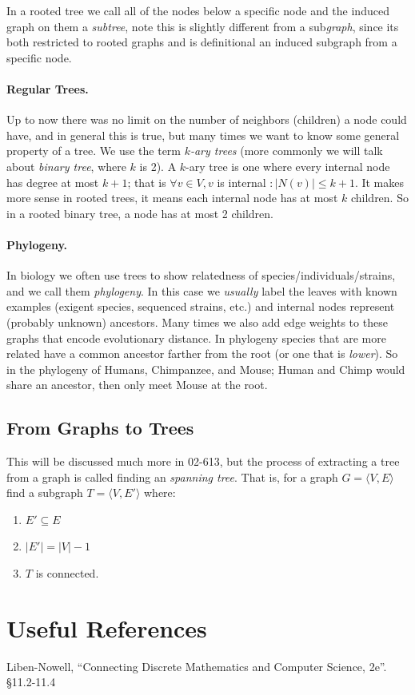 In a rooted tree we call all of the nodes below a specific node and the induced graph on them a \emph{subtree}, 
note this is slightly different from a sub\textit{graph}, since its both restricted to rooted graphs and is definitional an induced subgraph from a specific node. 


\paragraph{Regular Trees.} 
Up to now there was no limit on the number of neighbors (children) a node could have, and in general this is true, but many times we want to know some general property of a tree. 
We use the term \emph{$k$-ary trees} (more commonly we will talk about \emph{binary tree}, where $k$ is 2).
A $k$-ary tree is one where every internal node has degree at most $k+1$; that is 
$\forall v\in V, v $ is internal $: |N(v)| \le k+1$. 
It makes more sense in rooted trees, it means each internal node has at most $k$ children. 
So in a rooted binary tree, a node has at most 2 children. 

\paragraph{Phylogeny.} 
In biology we often use trees to show relatedness of species/individuals/strains, and we call them \emph{phylogeny}. 
In this case we \textit{usually} label the leaves with known examples (exigent species, sequenced strains, etc.) and internal nodes represent (probably unknown) ancestors. 
Many times we also add edge weights to these graphs that encode evolutionary distance. 
In phylogeny species that are more related have a common ancestor farther from the root (or one that is \textit{lower}). 
So in the phylogeny of Humans, Chimpanzee, and Mouse; Human and Chimp would share an ancestor, then only meet Mouse at the root.

\subsection{From Graphs to Trees}
This will be discussed much more in 02-613, but the process of extracting a tree from a graph is called finding an \emph{spanning tree}. 
That is, for a graph $G=\langle V, E\rangle$ find a subgraph $T=\langle V, E'\rangle$ where:
\begin{enumerate}
\item $E' \subseteq E$
\item $|E'| = |V|-1$
\item $T$ is connected. 
\end{enumerate}



\section*{Useful References}
Liben-Nowell, ``Connecting Discrete Mathematics and Computer Science, 2e''. \S 11.2-11.4

